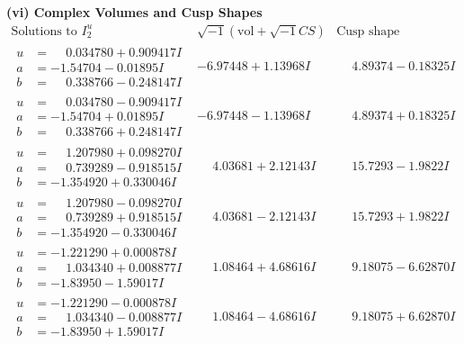 \documentclass[1p]{elsarticle_modified}
\theoremstyle{definition}
\newcommand{\I}{\sqrt{-1}}
\begin{document}
\newpage\flushleft \textbf{(vi) Complex Volumes and Cusp Shapes}
$$\begin{array}{c|c|c}  
\text{Solutions to }I^u_{2}& \I (\text{vol} + \sqrt{-1}CS) & \text{Cusp shape}\\
 \hline 
\begin{aligned}
u &= \phantom{-}0.034780 + 0.909417 I \\
a &= -1.54704 - 0.01895 I \\
b &= \phantom{-}0.338766 - 0.248147 I\end{aligned}
 & -6.97448 + 1.13968 I & \phantom{-}4.89374 - 0.18325 I \\ \hline\begin{aligned}
u &= \phantom{-}0.034780 - 0.909417 I \\
a &= -1.54704 + 0.01895 I \\
b &= \phantom{-}0.338766 + 0.248147 I\end{aligned}
 & -6.97448 - 1.13968 I & \phantom{-}4.89374 + 0.18325 I \\ \hline\begin{aligned}
u &= \phantom{-}1.207980 + 0.098270 I \\
a &= \phantom{-}0.739289 - 0.918515 I \\
b &= -1.354920 + 0.330046 I\end{aligned}
 & \phantom{-}4.03681 + 2.12143 I & \phantom{-}15.7293 - 1.9822 I \\ \hline\begin{aligned}
u &= \phantom{-}1.207980 - 0.098270 I \\
a &= \phantom{-}0.739289 + 0.918515 I \\
b &= -1.354920 - 0.330046 I\end{aligned}
 & \phantom{-}4.03681 - 2.12143 I & \phantom{-}15.7293 + 1.9822 I \\ \hline\begin{aligned}
u &= -1.221290 + 0.000878 I \\
a &= \phantom{-}1.034340 + 0.008877 I \\
b &= -1.83950 - 1.59017 I\end{aligned}
 & \phantom{-}1.08464 + 4.68616 I & \phantom{-}9.18075 - 6.62870 I \\ \hline\begin{aligned}
u &= -1.221290 - 0.000878 I \\
a &= \phantom{-}1.034340 - 0.008877 I \\
b &= -1.83950 + 1.59017 I\end{aligned}
 & \phantom{-}1.08464 - 4.68616 I & \phantom{-}9.18075 + 6.62870 I \\ \hline\begin{aligned}

\end{aligned}
\end{array}$$
\end{document}
